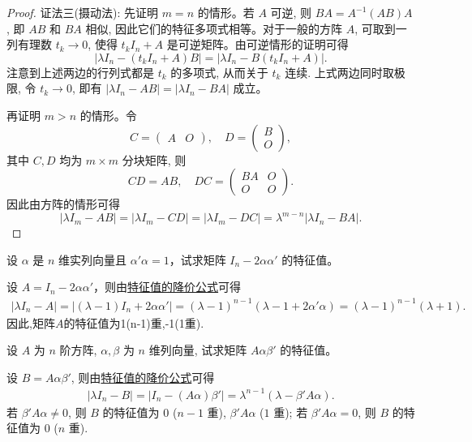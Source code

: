 \documentclass[../../main.tex]{subfiles}
\begin{document}
\begin{proof}
{\color{blue}证法三(摄动法):} 先证明 \(m = n\) 的情形。若 \(A\) 可逆, 则 \(BA = A^{-1}(AB)A\), 即 \(AB\) 和 \(BA\) 相似, 因此它们的特征多项式相等。对于一般的方阵 \(A\), 可取到一列有理数 \(t_k \to 0\), 使得 \(t_k I_n + A\) 是可逆矩阵。由可逆情形的证明可得
\[
|\lambda I_n - (t_k I_n + A)B| = |\lambda I_n - B(t_k I_n + A)|.
\]
注意到上述两边的行列式都是 \( t_k \) 的多项式, 从而关于 \( t_k \) 连续. 上式两边同时取极限, 令 \( t_k \to 0 \), 即有
\(
|\lambda I_n - AB| = |\lambda I_n - BA|
\)
成立。

再证明 \( m > n \) 的情形。令
\[
C = \begin{pmatrix}
A & O
\end{pmatrix}, \quad D = \begin{pmatrix}
B \\
O
\end{pmatrix},
\]
其中 \( C, D \) 均为 \( m \times m \) 分块矩阵, 则
\[
CD = AB, \quad DC = \begin{pmatrix}
BA & O \\
O & O
\end{pmatrix}.
\]
因此由方阵的情形可得
\[
|\lambda I_m - AB| = |\lambda I_m - CD| = |\lambda I_m - DC| = \lambda^{m-n} |\lambda I_n - BA|.
\]
\end{proof}

\begin{example}
设 $\alpha$ 是 $n$ 维实列向量且 $\alpha' \alpha = 1$，试求矩阵 $I_n - 2 \alpha \alpha'$ 的特征值。
\end{example}
\begin{solution}
设 $A = I_n - 2 \alpha \alpha'$，则由\hyperref[theorem:特征值的降价公式]{特征值的降价公式}可得
\begin{align*}
| \lambda I_n - A | 
= | (\lambda - 1) I_n + 2 \alpha \alpha' | 
= (\lambda - 1)^{n-1} (\lambda - 1 + 2 \alpha' \alpha) 
= (\lambda - 1)^{n-1} (\lambda + 1).
\end{align*}
因此,矩阵$A$的特征值为1(n-1)重,-1(1重).
\end{solution}

\begin{example}
设 $A$ 为 $n$ 阶方阵, $\alpha, \beta$ 为 $n$ 维列向量, 试求矩阵 $A \alpha \beta'$ 的特征值。
\end{example}
\begin{solution}
设 $B = A \alpha \beta'$, 则由\hyperref[theorem:特征值的降价公式]{特征值的降价公式}可得
\begin{align*}
| \lambda I_n - B | 
= | I_n - (A \alpha) \beta' | 
= \lambda^{n-1} (\lambda - \beta' A \alpha).
\end{align*}
若 $\beta' A \alpha \neq 0$, 则 $B$ 的特征值为 $0$ ($n-1$ 重), $\beta' A \alpha$ ($1$ 重); 若 $\beta' A \alpha = 0$, 则 $B$ 的特征值为 $0$ ($n$ 重).
\end{solution}
\end{document}
